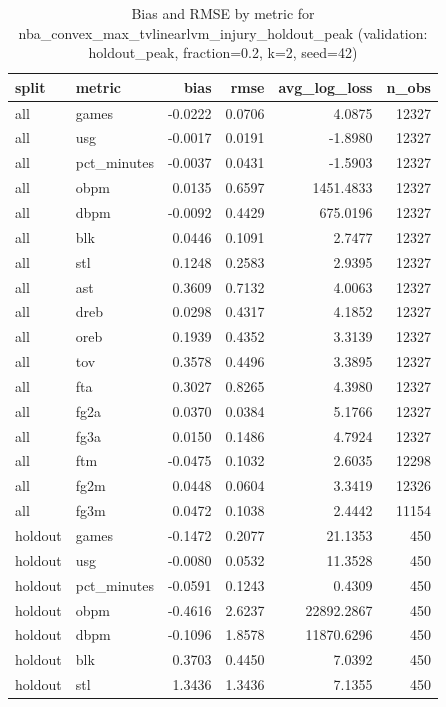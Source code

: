 \begin{table}
\caption{Bias and RMSE by metric for nba_convex_max_tvlinearlvm_injury_holdout_peak (validation: holdout_peak, fraction=0.2, k=2, seed=42)}
\label{tab:nba_convex_max_tvlinearlvm_injury_holdout_peak_vs_holdout_peak_f20_k2_s42_bias_rmse}
\begin{tabular}{llrrrr}
\toprule
split & metric & bias & rmse & avg\_log\_loss & n\_obs \\
\midrule
all & games & -0.0222 & 0.0706 & 4.0875 & 12327 \\
all & usg & -0.0017 & 0.0191 & -1.8980 & 12327 \\
all & pct\_minutes & -0.0037 & 0.0431 & -1.5903 & 12327 \\
all & obpm & 0.0135 & 0.6597 & 1451.4833 & 12327 \\
all & dbpm & -0.0092 & 0.4429 & 675.0196 & 12327 \\
all & blk & 0.0446 & 0.1091 & 2.7477 & 12327 \\
all & stl & 0.1248 & 0.2583 & 2.9395 & 12327 \\
all & ast & 0.3609 & 0.7132 & 4.0063 & 12327 \\
all & dreb & 0.0298 & 0.4317 & 4.1852 & 12327 \\
all & oreb & 0.1939 & 0.4352 & 3.3139 & 12327 \\
all & tov & 0.3578 & 0.4496 & 3.3895 & 12327 \\
all & fta & 0.3027 & 0.8265 & 4.3980 & 12327 \\
all & fg2a & 0.0370 & 0.0384 & 5.1766 & 12327 \\
all & fg3a & 0.0150 & 0.1486 & 4.7924 & 12327 \\
all & ftm & -0.0475 & 0.1032 & 2.6035 & 12298 \\
all & fg2m & 0.0448 & 0.0604 & 3.3419 & 12326 \\
all & fg3m & 0.0472 & 0.1038 & 2.4442 & 11154 \\
holdout & games & -0.1472 & 0.2077 & 21.1353 & 450 \\
holdout & usg & -0.0080 & 0.0532 & 11.3528 & 450 \\
holdout & pct\_minutes & -0.0591 & 0.1243 & 0.4309 & 450 \\
holdout & obpm & -0.4616 & 2.6237 & 22892.2867 & 450 \\
holdout & dbpm & -0.1096 & 1.8578 & 11870.6296 & 450 \\
holdout & blk & 0.3703 & 0.4450 & 7.0392 & 450 \\
holdout & stl & 1.3436 & 1.3436 & 7.1355 & 450 \\

\end{tabular}
\end{table}
